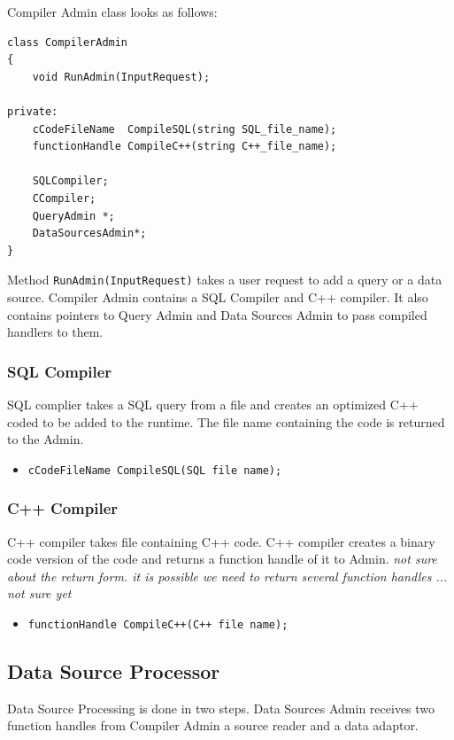 \documentclass[14pt]{article}
\begin{document}
\noindent Compiler Admin class looks as follows:
\begin{verbatim}
class CompilerAdmin
{
    void RunAdmin(InputRequest);

private:
    cCodeFileName  CompileSQL(string SQL_file_name);
    functionHandle CompileC++(string C++_file_name);
	
    SQLCompiler;
    CCompiler;
    QueryAdmin *;
    DataSourcesAdmin*;
}
\end{verbatim}

Method {\tt RunAdmin(InputRequest)} takes a user request to add a query or a data source. Compiler Admin contains a SQL Compiler and C++ compiler. It also contains pointers to Query Admin and Data Sources Admin to pass compiled handlers to them.

\subsubsection{SQL Compiler}

SQL complier takes a SQL query from a file and creates an optimized C++ coded to be added to the runtime. The file name containing the code is returned to the Admin.

\begin{itemize}
	\item {\tt cCodeFileName CompileSQL(SQL file name);}
\end{itemize}

\subsubsection{C++ Compiler}

C++ compiler takes file containing C++ code. C++ compiler creates a binary code version of the code and returns a function handle of it to Admin. \emph{not sure about the return form. it is possible we need to return several function handles ... not sure yet}

\begin{itemize}
	\item {\tt functionHandle CompileC++(C++ file name);}
\end{itemize}

\subsection{Data Source Processor}

\noindent Data Source Processing is done in two steps. Data Sources Admin receives two function handles from Compiler Admin a source reader and a data adaptor. 
\end{document}
